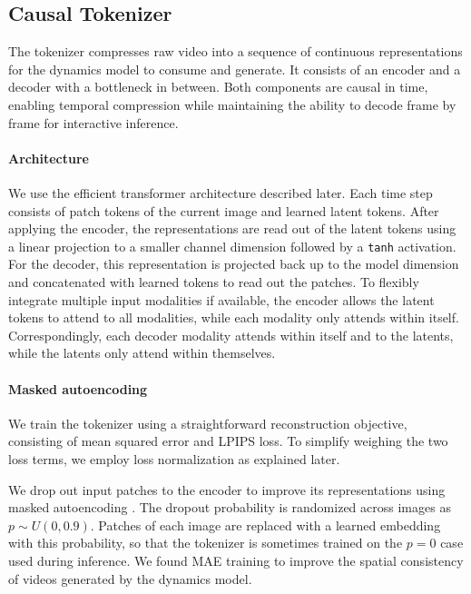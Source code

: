 \documentclass[11pt]{article}
\begin{document}


\pagebreak
\subsection{Causal Tokenizer}
\label{sec:tokenizer}

The tokenizer compresses raw video into a sequence of continuous representations for the dynamics model to consume and generate.
It consists of an encoder and a decoder with a bottleneck in between.
Both components are causal in time, enabling temporal compression while maintaining the ability to decode frame by frame for interactive inference.

\paragraph{Architecture}

We use the efficient transformer architecture described later.
Each time step consists of patch tokens of the current image and learned latent tokens.
After applying the encoder, the representations are read out of the latent tokens using a linear projection to a smaller channel dimension followed by a \texttt{tanh} activation.
For the decoder, this representation is projected back up to the model dimension and concatenated with learned tokens to read out the patches.
To flexibly integrate multiple input modalities if available, the encoder allows the latent tokens to attend to all modalities, while each modality only attends within itself.
Correspondingly, each decoder modality attends within itself and to the latents, while the latents only attend within themselves.

\paragraph{Masked autoencoding}

We train the tokenizer using a straightforward reconstruction objective, consisting of mean squared error and LPIPS \citep{lpips} loss.
To simplify weighing the two loss terms, we employ loss normalization as explained later.


We drop out input patches to the encoder to improve its representations using masked autoencoding \citep{mae,chen2025maetok}.
The dropout probability is randomized across images as $p \sim U(0, 0.9)$. Patches of each image are replaced with a learned embedding with this probability, so that the tokenizer is sometimes trained on the $p=0$ case used during inference.
We found MAE training to improve the spatial consistency of videos generated by the dynamics model.
\end{document}
